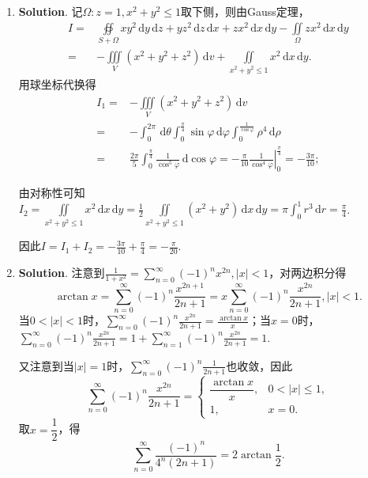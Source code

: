 \documentclass[../main.tex]{subfiles}
\begin{document}
\begin{enumerate}
    \item \textbf{Solution}. 记$\Omega:z=1,x^2+y^2\le1$取下侧，则由Gauss定理，
          \[
              \begin{aligned}
                  I={} & \oiint\limits_{S+\Omega} xy^2\,\mathrm{d}y\,\mathrm{d}z+yz^2\,\mathrm{d}z\,\mathrm{d}x+zx^2\,\mathrm{d}x\,\mathrm{d}y-\iint\limits_\Omega zx^2\,\mathrm{d}x\,\mathrm{d}y \\
                  ={}  & -\iiint\limits_V\left(x^2+y^2+z^2\right)\,\mathrm{d}v+\iint\limits_{x^2+y^2\le1} x^2\,\mathrm{d}x\,\mathrm{d}y.
              \end{aligned}
          \]
          用球坐标代换得
          \[
              \begin{aligned}
                  I_1={} & -\iiint\limits_V\left(x^2+y^2+z^2\right)\,\mathrm{d}v                                                                                                                      \\
                  ={}    & -\int_0^{2\pi}\,\mathrm{d}\theta\int_0^{\frac{\pi}{4}}\sin\varphi\,\mathrm{d}\varphi\int_0^{\frac{1}{\cos\varphi}}\rho^4\,\mathrm{d}\rho                                   \\
                  ={}    & \frac{2\pi}{5}\int_0^{\frac{\pi}{4}}\frac{1}{\cos^5\varphi}\,\mathrm{d}\cos\varphi=\left.-\frac{\pi}{10}\frac{1}{\cos^4\varphi}\right|_0^{\frac{\pi}{4}}=-\frac{3\pi}{10};
              \end{aligned}
          \]

          由对称性可知$I_2=\iint\limits_{x^2+y^2\le1} x^2\,\mathrm{d}x\,\mathrm{d}y=\frac{1}{2}\iint\limits_{x^2+y^2\le1} (x^2+y^2)\,\mathrm{d}x\,\mathrm{d}y=\pi\int_0^1 r^3\,\mathrm{d}r=\frac{\pi}{4}$.

          因此$I=I_1+I_2=-\frac{3\pi}{10}+\frac{\pi}{4}=-\frac{\pi}{20}$.

    \item \textbf{Solution}. 注意到$\frac{1}{1+x^2}=\sum_{n=0}^{\infty}(-1)^nx^{2n},|x|<1$，对两边积分得
          \[
              \arctan x = \sum_{n=0}^{\infty}(-1)^n\frac{x^{2n+1}}{2n+1}=x\sum_{n=0}^{\infty}(-1)^n\frac{x^{2n}}{2n+1},|x|<1.
          \]
          当$0<|x|<1$时，$\sum_{n=0}^{\infty}(-1)^n\frac{x^{2n}}{2n+1}=\frac{\arctan x}{x}$；当$x=0$时，$\sum_{n=0}^{\infty}(-1)^n\frac{x^{2n}}{2n+1}=1+\sum_{n=1}^{\infty}(-1)^n\frac{x^{2n}}{2n+1}=1$.

          又注意到当$|x|=1$时，$\sum_{n=0}^{\infty}(-1)^n\frac{1}{2n+1}$也收敛，因此
          \[
              \sum_{n=0}^{\infty}(-1)^n\frac{x^{2n}}{2n+1}
              =
              \begin{cases}
                  \dfrac{\arctan x}{x}, & 0<|x|\leq 1, \\
                  1,                    & x=0.
              \end{cases}
          \]
          取$x=\dfrac12$，得
          \[
              \sum_{n=0}^{\infty}\frac{(-1)^n}{4^n(2n+1)}
              =2\arctan\frac12.
          \]

\end{enumerate}
\end{document}
